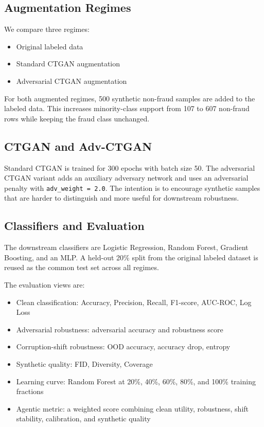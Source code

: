 \documentclass[conference]{IEEEtran}
\begin{document}
\subsection{Augmentation Regimes}

We compare three regimes:
\begin{itemize}
    \item Original labeled data
    \item Standard CTGAN augmentation
    \item Adversarial CTGAN augmentation
\end{itemize}

For both augmented regimes, 500 synthetic non-fraud samples are added to the labeled data. This increases minority-class support from 107 to 607 non-fraud rows while keeping the fraud class unchanged.

\subsection{CTGAN and Adv-CTGAN}

Standard CTGAN is trained for 300 epochs with batch size 50. The adversarial CTGAN variant adds an auxiliary adversary network and uses an adversarial penalty with \texttt{adv\_weight = 2.0}. The intention is to encourage synthetic samples that are harder to distinguish and more useful for downstream robustness.

\subsection{Classifiers and Evaluation}

The downstream classifiers are Logistic Regression, Random Forest, Gradient Boosting, and an MLP. A held-out 20\% split from the original labeled dataset is reused as the common test set across all regimes.

The evaluation views are:
\begin{itemize}
    \item Clean classification: Accuracy, Precision, Recall, F1-score, AUC-ROC, Log Loss
    \item Adversarial robustness: adversarial accuracy and robustness score
    \item Corruption-shift robustness: OOD accuracy, accuracy drop, entropy
    \item Synthetic quality: FID, Diversity, Coverage
    \item Learning curve: Random Forest at 20\%, 40\%, 60\%, 80\%, and 100\% training fractions
    \item Agentic metric: a weighted score combining clean utility, robustness, shift stability, calibration, and synthetic quality
\end{itemize}
\end{document}
